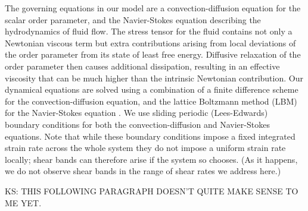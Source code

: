 \documentclass[8.5pt,twoside,twocolumn]{article}
\begin{document}
The governing equations in our model are a convection-diffusion equation
for the scalar order parameter, and the Navier-Stokes equation describing
the hydrodynamics of fluid flow. The stress tensor for the fluid contains not only a Newtonian viscous term but extra contributions arising from local deviations of the order parameter from its state of least free energy. Diffusive relaxation of the order parameter then causes additional dissipation, resulting in an effective viscosity that can be much higher than the intrinsic Newtonian contribution.
Our dynamical equations are solved using a combination of a finite
difference scheme for the convection-diffusion equation, and the
lattice Boltzmann method (LBM)~\cite{Succi} for the Navier-Stokes equation \cite{Marenduzzo07, Henrich10a,  Henrich10b, Henrich11a,Gonnella97}.
We use sliding periodic (Lees-Edwards) boundary conditions for
both the convection-diffusion and Navier-Stokes equations. Note that while these boundary conditions impose a fixed integrated strain rate across the whole system they do not impose a uniform strain rate locally; shear bands can therefore arise if the system so chooses. (As it happens, we do not observe shear bands in the range of shear rates we address here.)





KS: THIS FOLLOWING PARAGRAPH DOESN'T QUITE MAKE SENSE TO ME YET.
\end{document}
